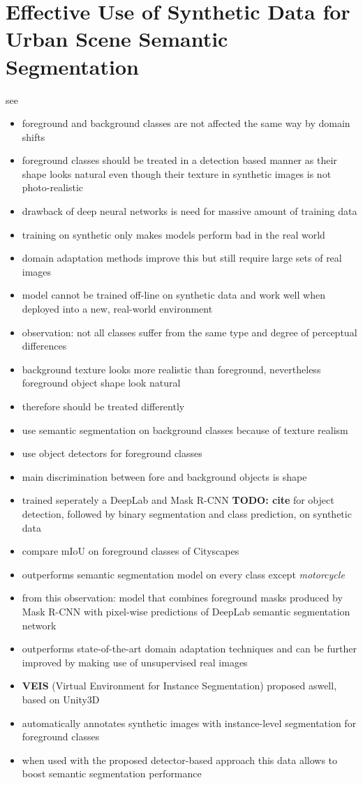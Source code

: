 \documentclass[]{article}
\newcommand{\todo}[1]{{\color{red}\bf{TODO: #1}}}
\begin{document}
\section{Effective Use of Synthetic Data for Urban Scene Semantic Segmentation}

see \cite{DBLP:journals/corr/abs-1807-06132}

\begin{itemize}
	\item foreground and background classes are not affected the same way by domain shifts
	\item foreground classes should be treated in a detection based manner as their shape looks natural even though their texture in synthetic images is not photo-realistic
	\item drawback of deep neural networks is need for massive amount of training data
	\item training on synthetic only makes models perform bad in the real world
	\item domain adaptation methods improve this but still require large sets of real images
	\item model cannot be trained off-line on synthetic data and work well when deployed into a new, real-world environment
	\item observation: not all classes suffer from the same type and degree of perceptual differences
	\item background texture looks more realistic than foreground, nevertheless foreground object shape look natural
	\item therefore should be treated differently
	\item use semantic segmentation on background classes because of texture realism
	\item use object detectors for foreground classes
	\item main discrimination between fore and background objects is shape
	\item trained seperately a DeepLab and Mask R-CNN \todo{cite} for object detection, followed by binary segmentation and class prediction, on synthetic data
	\item compare mIoU on foreground classes of Cityscapes
	\item outperforms semantic segmentation model on every class except \textit{motorcycle}
	\item from this observation: model that combines foreground masks produced by Mask R-CNN with pixel-wise predictions of DeepLab semantic segmentation network
	\item outperforms state-of-the-art domain adaptation techniques and can be further improved by making use of unsupervised real images
	\item \textbf{VEIS} (Virtual Environment for Instance Segmentation) proposed aswell, based on Unity3D
	\item automatically annotates synthetic images with instance-level segmentation for foreground classes
	\item when used with the proposed detector-based approach this data allows to boost semantic segmentation performance
\end{itemize}
\end{document}
